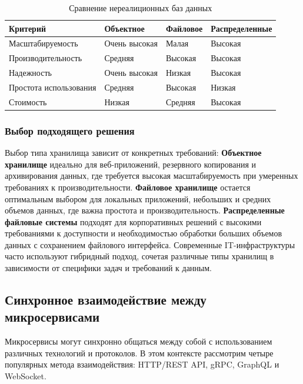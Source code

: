\begin{table}[H]
\centering
\begin{tabular}{|l|l|l|l|}
\hline
\textbf{Критерий}       & \textbf{Объектное}            & \textbf{Файловое}             & \textbf{Распределенные} \\ \hline
Масштабируемость        & Очень высокая                 & Малая                         & Высокая \\ \hline
Производительность      & Средняя                       & Высокая                       & Высокая \\ \hline
Надежность              & Очень высокая                 & Низкая                        & Высокая \\ \hline
Простота использования  & Средняя                       & Высокая                       & Низкая \\ \hline
Стоимость               & Низкая                        & Средняя                       & Высокая \\ \hline
\end{tabular}
\caption{Сравнение нереалиционных баз данных}
\end{table}

\subsubsection* {Выбор подходящего решения}
Выбор типа хранилища зависит от конкретных требований:
\textbf{Объектное хранилище} идеально для веб-приложений, резервного копирования и архивирования данных, где требуется высокая масштабируемость при умеренных требованиях к производительности.
\textbf{Файловое хранилище} остается оптимальным выбором для локальных приложений, небольших и средних объемов данных, где важна простота и производительность.
\textbf{Распределенные файловые системы} подходят для корпоративных решений с высокими требованиями к доступности и необходимостью обработки больших объемов данных с сохранением файлового интерфейса.
Современные IT-инфраструктуры часто используют гибридный подход, сочетая различные типы хранилищ в зависимости от специфики задач и требований к данным.

\subsection{Синхронное взаимодействие между микросервисами}

Микросервисы могут синхронно общаться между собой с использованием различных технологий и протоколов. 
В этом контексте рассмотрим четыре популярных метода взаимодействия: HTTP/REST API, gRPC, GraphQL и WebSocket.

